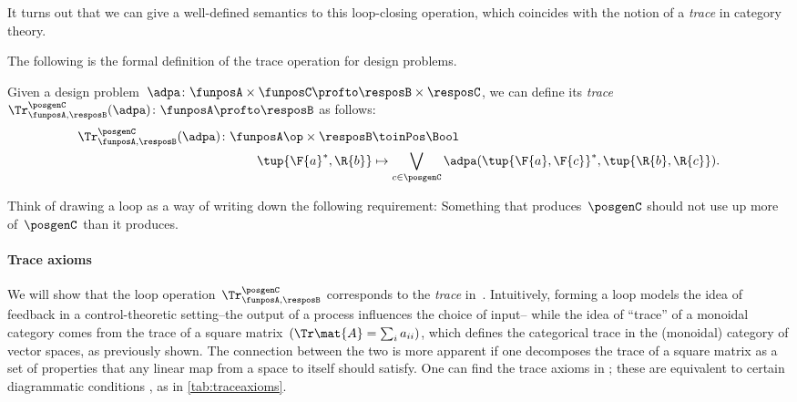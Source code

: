 It turns out that we can give a well-defined semantics to this loop-closing operation, which coincides with the notion of a \emph{trace} in category theory.

The following is the formal definition of the trace operation for design problems.


\begin{definition}
    \label{def:dp-trace}
    Given a design problem~$\adpa\colon \funposA \times \funposC \profto \resposB \times \resposC$, we can define
    its \emph{trace}~$\Tr_{\funposA,\resposB}^\posgenC(\adpa) \colon \funposA \profto \resposB$ as follows:
%
    \begin{equation}
        \label{eq:tracedef}
        \begin{aligned}
            \Tr_{\funposA,\resposB}^\posgenC(\adpa) \colon  \funposA\op \times \resposB &\toinPos \Bool \\
            \tup{\F{a}^*, \R{b}} &\mapsto \bigvee_{c\in \posgenC}
            \adpa(\tup{\F{a}, \F{c}}^*,
            \tup{\R{b}, \R{c}}).
        \end{aligned}
    \end{equation}
\end{definition}


Think of drawing a loop as a way of writing down the following requirement: Something that produces~$\posgenC$ should not use up more of~$\posgenC$ than it produces.


\paragraph{Trace axioms}
We will show that the loop operation~$\Tr_{\funposA,\resposB}^\posgenC$ corresponds to the \emph{trace} in~\DP.
Intuitively, forming a loop models the idea of feedback in a control-theoretic setting--the output of a process influences the choice of input--
while the idea of ``trace'' of a monoidal category comes from the trace of a square matrix~$(\Tr\mat{A} = \sum_i a_{ii})$, which defines the categorical trace in the (monoidal) category of vector spaces, as previously shown.
The connection between the two is more apparent if one decomposes the trace of a square matrix as a set of properties that any linear map from a space to itself should satisfy. One can find the trace axioms in  \cite{mac2013categories};
these are equivalent to certain diagrammatic conditions \cite{joyal96}, as in \cref{tab:traceaxioms}.


